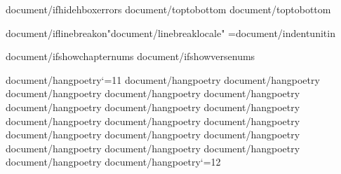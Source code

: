 {document/ifhidehboxerrors}\overfullrule=0pt
{document/toptobottom}     %
{document/toptobottom}\rotatetrue

{document/iflinebreakon}\XeTeXlinebreaklocale "{document/linebreaklocale}"
={document/indentunit}in

{document/ifshowchapternums}\OmitChapterNumbertrue
\def\AfterChapterSpaceFactor{{{texpert/afterchapterspace}}}
{document/ifshowversenums}\def\AfterVerseSpaceFactor{{{texpert/afterversespace}}}

{document/hangpoetry}\catcode`\@=11
{document/hangpoetry}
{document/hangpoetry}
{document/hangpoetry}
{document/hangpoetry}
{document/hangpoetry}
{document/hangpoetry}
{document/hangpoetry}
{document/hangpoetry}
{document/hangpoetry}
{document/hangpoetry}
{document/hangpoetry}
{document/hangpoetry}
{document/hangpoetry}
{document/hangpoetry}
{document/hangpoetry}
{document/hangpoetry}
{document/hangpoetry}
{document/hangpoetry}
{document/hangpoetry}\catcode`\@=12

